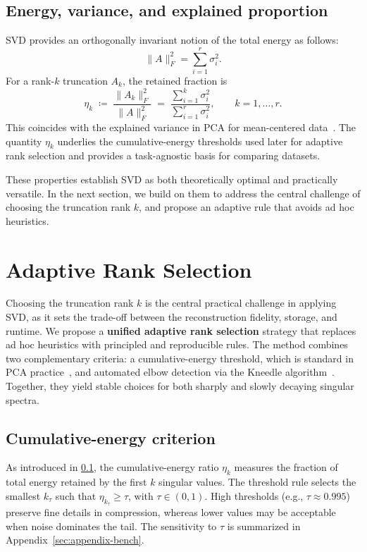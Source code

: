\documentclass[11pt,a4paper]{article}
\begin{document}
\subsection{Energy, variance, and explained proportion}
\label{sec:energy}
SVD provides an orthogonally invariant notion of the total energy as follows:
\[
\|A\|_F^2 = \sum_{i=1}^{r} \sigma_i^2.
\]
For a rank-$k$ truncation $A_k$, the retained fraction is
\[
\eta_k \;\coloneqq\; \frac{\|A_k\|_F^2}{\|A\|_F^2} \;=\; \frac{\sum_{i=1}^{k} \sigma_i^2}{\sum_{i=1}^{r} \sigma_i^2}, 
\qquad k=1,\dots,r.
\]
This coincides with the explained variance in PCA for mean-centered data~\cite{jolliffe2016pca}. 
The quantity $\eta_k$ underlies the cumulative-energy thresholds used later for adaptive rank selection and provides a task-agnostic basis for comparing datasets.

\medskip
These properties establish SVD as both theoretically optimal and practically versatile. 
In the next section, we build on them to address the central challenge of choosing the truncation rank $k$, and propose an adaptive rule that avoids ad hoc heuristics.

\section{Adaptive Rank Selection}
\label{sec:adaptive}

Choosing the truncation rank \(k\) is the central practical challenge in applying SVD, as it sets the trade-off between the reconstruction fidelity, storage, and runtime. 
We propose a \textbf{unified adaptive rank selection} strategy that replaces ad hoc heuristics with principled and reproducible rules. 
The method combines two complementary criteria: a cumulative-energy threshold, which is standard in PCA practice~\cite{jolliffe2016pca}, and automated elbow detection via the Kneedle algorithm~\cite{satopaa2011kneedle}. 
Together, they yield stable choices for both sharply and slowly decaying singular spectra.

\subsection{Cumulative-energy criterion}
As introduced in \cref{sec:energy}, the cumulative-energy ratio $\eta_k$ measures the fraction of total energy retained by the first $k$ singular values. The threshold rule selects the smallest $k_\tau$ such that $\eta_{k_\tau}\ge\tau$, with $\tau\in(0,1)$. 
High thresholds (e.g., $\tau\approx0.995$) preserve fine details in compression, whereas lower values may be acceptable when noise dominates the tail. 
The sensitivity to $\tau$ is summarized in Appendix~\ref{sec:appendix-bench}.
\end{document}
